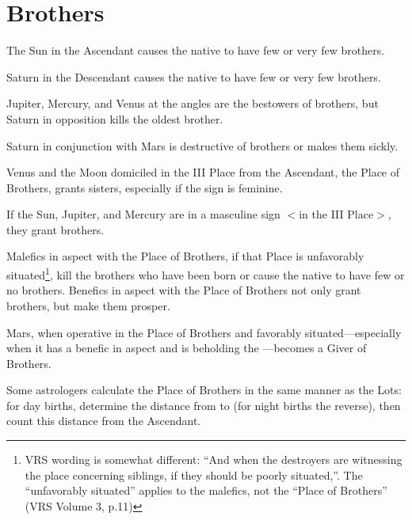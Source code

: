 \section{Brothers}

The Sun in the Ascendant causes the native to have few or very few brothers. 

Saturn in the Descendant causes the native to have few or very few brothers. 

Jupiter, Mercury, and Venus at the angles are the bestowers of brothers, but Saturn in opposition kills the oldest brother. 

Saturn in conjunction with Mars is destructive of brothers or makes them sickly. 

Venus and the Moon domiciled in the III Place from the Ascendant, the Place of Brothers, grants sisters, especially if the sign is feminine. 

If the Sun, Jupiter, and Mercury are in a masculine sign $<$in the III Place$>$, they grant brothers. 

Malefics in aspect with the Place of Brothers, if that Place is unfavorably situated\footnote{VRS wording is somewhat different: ``And when the destroyers are witnessing the place concerning siblings, if they should be poorly situated,''. The ``unfavorably situated'' applies to the malefics, not the ``Place of Brothers'' (VRS Volume 3, p.11)}, kill the brothers who have been born or cause the native to have few or no brothers. Benefics in aspect with the Place of Brothers not only grant brothers, but make them prosper. 

Mars, when operative in the Place of Brothers and favorably situated—especially when it has a benefic in aspect and is beholding the \Moon—becomes a Giver of Brothers.

Some astrologers calculate the Place of Brothers in the same manner as the Lots: for day births, determine the distance from \Saturn\xspace to \Jupiter\xspace (for night births the reverse), then count this distance from the Ascendant.

\newpage